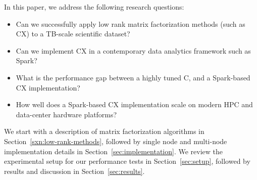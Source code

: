 In this paper, we address the following research questions:
\begin{itemize}
\item Can we successfully apply low rank matrix factorization methods (such as CX) to a TB-scale scientific dataset?

\item Can we implement CX in a contemporary data analytics framework such as Spark?

\item What is the performance gap between a highly tuned C, and a Spark-based CX implementation? 

\item How well does a Spark-based CX implementation scale on modern HPC and data-center hardware platforms?
\end{itemize}

We start with a description of matrix factorization algorithms in Section~\ref{sxn:low-rank-methods}, followed by single node and multi-node implementation details in Section~\ref{sec:implementation}. We review the experimental setup for our performance tests in Section~\ref{sec:setup}, followed by results and discussion in Section~\ref{sec:results}.

